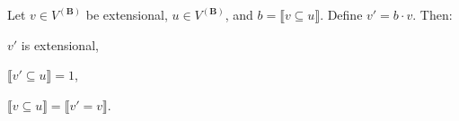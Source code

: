 Let $v \in V^{(\mathbf{B})}$ be extensional, $u \in V^{(\mathbf{B})}$, and $b = \llbracket v \subseteq u \rrbracket$. Define $v' = b \cdot v$. Then:

\quad $v'$ is extensional,

\quad $\llbracket v' \subseteq u \rrbracket = 1$,

\quad $\llbracket v \subseteq u \rrbracket = \llbracket v' = v \rrbracket$.
